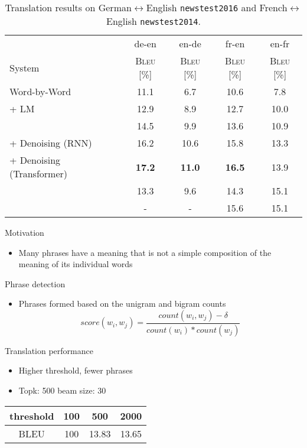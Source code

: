 \documentclass[11pt, a4paper, landscape]{article}
\begin{document}
	\begin{table}
	\setcounter{table}{1}
	\caption{Translation results on German$\leftrightarrow$English \texttt{newstest2016} and French$\leftrightarrow$English \texttt{newstest2014}.}
	  \centering
		\begin{tabular}{lcccc}
		  	\toprule
		  	& de-en & en-de & fr-en & en-fr\\
		  	System & \textsc{Bleu} [\%] & \textsc{Bleu} [\%] & \textsc{Bleu} [\%] & \textsc{Bleu} [\%]\\
		  	\midrule
		  	Word-by-Word  & 11.1 & 6.7 & 10.6 & 7.8\\
		  	\midrule
		  	+ LM  & 12.9 & 8.9 & 12.7 & 10.0\\
		  	& 14.5 & 9.9 & 13.6 & 10.9\\
		  	\midrule
		  	\hspace{10pt}+ Denoising (RNN)  & 16.2 & 10.6 & 15.8 & 13.3 \\
		  	\hspace{10pt}+ Denoising (Transformer) & \textbf{17.2} & \textbf{11.0} & \textbf{16.5} & 13.9 \\
		  	\midrule
		  	\cite{lample2017unsupervised} & 13.3 & 9.6 & 14.3 & 15.1\\
		  	\cite{artetxe2017unsupervised} & - & - & 15.6 & 15.1\\
		  	\bottomrule
		\end{tabular}

		\label{tab:results}
	\end{table}	
	\vfill
	\NewPage
	Motivation
	\begin{itemize}
		\item Many phrases have a meaning that is not a simple composition of the meaning of its individual words
	\end{itemize}
	Phrase detection
	\begin{itemize}
		\item Phrases formed based on the unigram and bigram counts
		\[ score(w_i, w_j) = \frac{count(w_i, w_j) - \delta}{count(w_i)*count(w_j)} \]
	\end{itemize}
	Translation performance
	\begin{itemize}
		\item Higher threshold, fewer phrases
		\item Topk: 500 beam size: 30
	\end{itemize}
	\begin{center}
		\begin{tabular}{|c|c|c|c| } 
			\hline
			threshold  & 100 & 500 & 2000 \\ 
			\hline
			BLEU  & 100 & 13.83 & 13.65 \\ 			
			\hline
		\end{tabular}
	\end{center}
	
\end{document}
